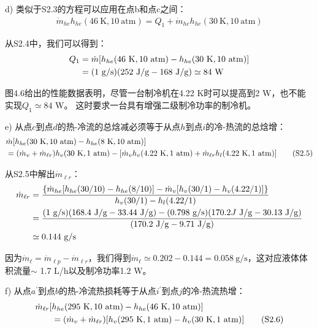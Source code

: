 d) 类似于S2.3的方程可以应用在点b和点c之间：
\begin{align*}%
\dot{m}_{he}h_{he}(46\ \mathrm{K},10\ \mathrm{atm})=Q_1+\dot{m}_{he}h_{he}(30\ \mathrm{K},10\ \mathrm{atm}) \tag{S2.4}
\end{align*}

从S2.4中，我们可以得到：
\begin{align*}%
Q_1&=\dot{m}[h_{he}(46\ \mathrm{K},10\ \mathrm{atm})-h_{he}(30\ \mathrm{K},10\ \mathrm{atm})]\\\notag
&=(1\ \mathrm{g/s})(252\ \mathrm{J/g}-168\ \mathrm{J/g})\simeq 84\ \mathrm{W}
\end{align*}

图4.6给出的性能数据表明，尽管一台制冷机在4.22 K时可以提高到2 W，也不能实现$Q_1\simeq 84$ W。
这时要求一台具有增强二级制冷功率的制冷机。

e) 从点$c$到点$d$的热-冷流的总焓减必须等于从点$h$到点$i$的冷-热流的总焓增：
\begin{align*}%
&\dot{m}[h_{he}(30\ \mathrm{K},10\ \mathrm{atm})-h_{he}(8\ \mathrm{K},10\ \mathrm{atm})]\\\notag
&=(\dot{m}_v+\dot{m}_{\ell r})h_v(30\ \mathrm{K},1\ \mathrm{atm})-[\dot{m}_vh_v(4.22\ \mathrm{K},1\ \mathrm{atm})+\dot{m}_{\ell r}h_l(4.22\ \mathrm{K},1\ \mathrm{atm})] \tag{S2.5}
\end{align*}

从S2.5中解出$\dot{m}_{\ell r}$：
\begin{align*}%
\dot{m}_{\ell r}&=\frac{\{\dot{m}_{he}[h_{he}(30/10)-h_{he}(8/10)]-\dot{m}_v[h_v(30/1)-h_{v}(4.22/1)]\}}{h_v(30/1)-h_{l}(4.22/1)}\\\notag
&=\frac{(1\ \mathrm{g/s})(168.4\ \mathrm{J/g}-33.44\ \mathrm{J/g})-(0.798 \ \mathrm{g/s})(170.2J\ \mathrm{J/g}-30.13\ \mathrm{J/g})}{(170.2\ \mathrm{J/g}-9.71\ \mathrm{J/g})}\\\notag
&\simeq 0.144 \ \mathrm{g/s}
\end{align*}

因为$\dot{m}_{\ell}=\dot{m}_{\ell p}-\dot{m}_{\ell r}$，我们得到$\dot{m}_{\ell}\simeq 0.202-0.144=0.058\ \mathrm{g/s}$，这对应液体体积流量$\sim$ 1.7 L/h以及制冷功率1.2 W。

f) 从点$a^\prime$到点$b$的热-冷流热损耗等于从点$i^\prime$到点$j$的冷-热流热增：
\begin{align*}%
\dot{m}_{\ell r}[&h_{he}(295\ \mathrm{K},10\ \mathrm{atm})-h_{he}(46\ \mathrm{K},10\ \mathrm{atm})]\\\notag
&=(\dot{m}_v+\dot{m}_{\ell r})[h_v(295\ \mathrm{K},1\ \mathrm{atm})-h_{v}(30\ \mathrm{K},1\ \mathrm{atm})] \tag{S2.6}
\end{align*}

